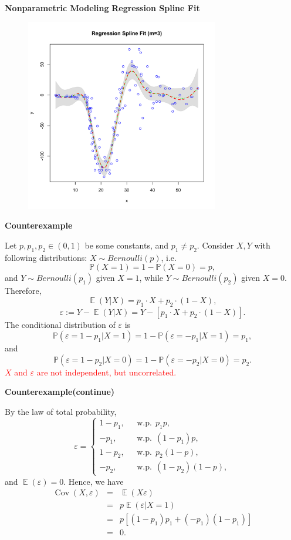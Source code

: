 \documentclass[19pt,landscaoe]{article}
\newcommand{\IP}{\mathbb{P}}
\DeclareMathOperator{\E}{\mathbb{E}}
\DeclareMathOperator{\cov}{\mathrm{Cov}}
\begin{document}
\newpage
{\LARGE{\textbf{Nonparametric Modeling}}}
\vskip25pt
{\Large\bf{Regression Spline Fit}}

\begin{figure}[h]
\centering
      \includegraphics[width=0.75\textwidth,height=0.52\textwidth]{splinefit.pdf}
    \label{figure3} 

\end{figure}
\newpage
{\LARGE\centerline{\textbf{Counterexample}}}
\vskip25pt
\begin{minipage}{.9\textwidth}
    \Large 
    Let $p,p_1,p_2\in(0,1)$ be some constants, and $p_1\ne p_2$. Consider $X,Y$ with following distributions: 
$X\sim Bernoulli(p)$, i.e. 
$$\IP(X=1)=1-\IP(X=0)=p,$$
and $Y\sim Bernoulli(p_1)$ given $X=1$, while $Y\sim Bernoulli(p_2)$ given $X=0$. Therefore, 
$$\E(Y|X)=p_1\cdot X+p_2\cdot(1-X),$$
$$\varepsilon:=Y-\E(Y|X)=Y-[p_1\cdot X+p_2\cdot(1-X)].$$
The conditional distribution of $\varepsilon$ is
$$\IP(\varepsilon=1-p_1|X=1)=1-\IP(\varepsilon=-p_1|X=1)=p_1,$$
and  
$$\IP(\varepsilon=1-p_2|X=0)=1-\IP(\varepsilon=-p_2|X=0)=p_2.$$
\textcolor{red}{$X$ and $\varepsilon$ are not independent, but uncorrelated.}
\end{minipage}

\newpage
{\LARGE\centerline{\textbf{Counterexample(continue)}}}
\vskip25pt
\begin{minipage}{.9\textwidth}
    \Large 
    By the law of total probability, 
    \begin{equation*}
        \varepsilon=\begin{cases}
            1-p_1,~~~&\mathrm{w.p.}~~p_1p,\\
            -p_1,~~~&\mathrm{w.p.}~~(1-p_1)p,\\
            1-p_2,~~~&\mathrm{w.p.}~~p_2(1-p),\\
            -p_2,~~~&\mathrm{w.p.}~~(1-p_2)(1-p),
        \end{cases}
    \end{equation*}
 and  $\E(\varepsilon)=0$. Hence, we have 
   \begin{eqnarray*}
    \cov(X,\varepsilon)&=&\E(X\varepsilon)\\
    &=&p\E(\varepsilon|X=1)\\
    &=&p[(1-p_1)p_1+(-p_1)(1-p_1)]\\
    &=&0.
   \end{eqnarray*}
\end{minipage}
\end{document}
